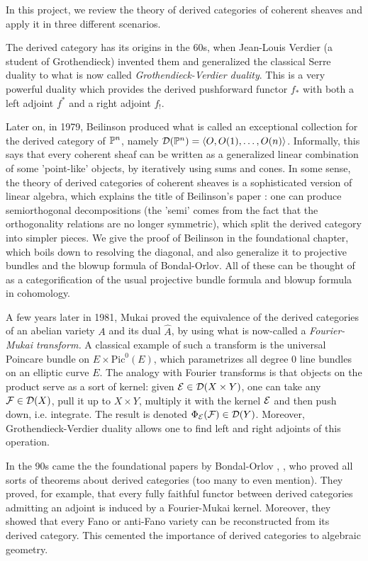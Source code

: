 In this project, we review the theory of derived categories of coherent sheaves and apply it in three different scenarios.

The derived category has its origins in the 60s, when Jean-Louis Verdier (a student of Grothendieck) invented them and generalized the classical Serre duality to what is now called \emph{Grothendieck-Verdier duality}. This is a very powerful duality which provides the derived pushforward functor $f_*$ with both a left adjoint $f^*$ and a right adjoint $f_!$. 

Later on, in 1979, Beilinson produced what is called an exceptional collection for the derived category of $\P^n$, namely $\calD(\P^n)=\langle O, O(1),\dots, O(n)\rangle$. Informally, this says that every coherent sheaf can be written as a generalized linear combination of some 'point-like' objects, by iteratively using sums and cones. In some sense, the theory of derived categories of coherent sheaves is a sophisticated version of linear algebra, which explains the title of Beilinson's paper \cite{Beilinson1978}: one can produce semiorthogonal decompositions (the 'semi' comes from the fact that the orthogonality relations are no longer symmetric), which split the derived category into simpler pieces. We give the proof of Beilinson in the foundational chapter, which boils down to resolving the diagonal, and also generalize it to projective bundles and the blowup formula of Bondal-Orlov. All of these can be thought of as a categorification of the usual projective bundle formula and blowup formula in cohomology.

A few years later in 1981, Mukai proved the equivalence of the derived categories of an abelian variety $A$ and its dual $\hat{A}$, by using what is now-called a \emph{Fourier-Mukai transform.} A classical example of such a transform is the universal Poincare bundle on $E\times \mathrm{Pic}^0(E)$, which parametrizes all degree $0$ line bundles on an elliptic curve $E$. The analogy with Fourier transforms is that objects on the product serve as a sort of kernel: given $\calE\in \calD(X\times Y)$, one can take any $\calF \in \calD(X)$, pull it up to $X\times Y$, multiply it with the kernel $\calE$ and then push down, i.e. integrate. The result is denoted $\Phi_\calE (\calF)\in \calD(Y)$. Moreover, Grothendieck-Verdier duality allows one to find left and right adjoints of this operation.

In the 90s came the the foundational papers by Bondal-Orlov \cite{bondal_semiorthogonal_1995}, \cite{bondal_reconstruction_2001}, who proved all sorts of theorems about derived categories (too many to even mention). They proved, for example, that every fully faithful functor between derived categories admitting an adjoint is induced by a Fourier-Mukai kernel. Moreover, they showed that every Fano or anti-Fano variety can be reconstructed from its derived category. This cemented the importance of derived categories to algebraic geometry.

